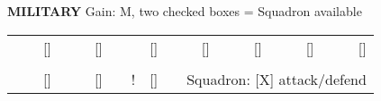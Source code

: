 \begin{flushleft}
  \textbf{MILITARY} \textcolor{supplemental}{Gain: M, two checked boxes = Squadron available}
\end{flushleft}
\begin{tabular}{ccccccccccccccccccccc}
\hhline{--~--~--~--~--~--~--~}
\multicolumn{1}{|c|}{\cellcolor{military}} &
  \multicolumn{1}{c|}{\cellcolor{military}} &
  \multicolumn{1}{c|}{{[}{]}} &
  \multicolumn{1}{c|}{\cellcolor{military}} &
  \multicolumn{1}{c|}{\cellcolor{military}} &
  \multicolumn{1}{c|}{{[}{]}} &
  \multicolumn{1}{c|}{\cellcolor{military}} &
  \multicolumn{1}{c|}{\cellcolor{military}} &
  \multicolumn{1}{c|}{{[}{]}} &
  \multicolumn{1}{c|}{\cellcolor{military}} &
  \multicolumn{1}{c|}{\cellcolor{military}} &
  \multicolumn{1}{c|}{{[}{]}} &
  \multicolumn{1}{c|}{\cellcolor{military}} &
  \multicolumn{1}{c|}{\cellcolor{military}} &
  \multicolumn{1}{c|}{{[}{]}} &
  \multicolumn{1}{c|}{\cellcolor{military}} &
  \multicolumn{1}{c|}{\cellcolor{military}} &
  \multicolumn{1}{c|}{{[}{]}} &
  \multicolumn{1}{c|}{\cellcolor{military}} &
  \multicolumn{1}{c|}{\cellcolor{military}} &
  {[}{]} \\ \cline{1-2} \cline{4-5} \cline{7-8} \cline{10-11} \cline{13-14} \cline{16-17} \cline{19-20}
 &
   &
   &
   &
   &
   &
   &
   &
   &
   &
   &
   &
   &
   &
   &
   &
   &
   &
   &
   &
   \\ \hhline{--~--~--~}
\multicolumn{1}{|c|}{\cellcolor{military}} &
  \multicolumn{1}{c|}{\cellcolor{military}} &
  \multicolumn{1}{c|}{{[}{]}} &
  \multicolumn{1}{c|}{\cellcolor{military}} &
  \multicolumn{1}{c|}{\cellcolor{military}} &
  \multicolumn{1}{c|}{{[}{]}} &
  \multicolumn{1}{c|}{\cellcolor{military}} &
  \multicolumn{1}{c|}{\cellcolor{military}!} &
  {[}{]} &
   &
  \multicolumn{11}{l}{{\color{supplemental}Squadron: {[}X{]} attack/defend}} \\ \cline{1-2} \cline{4-5} \cline{7-8}
\end{tabular}
